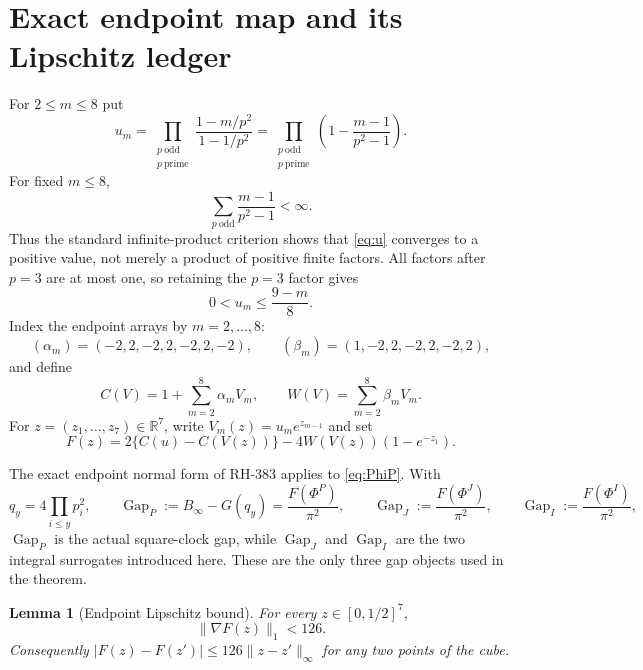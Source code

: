 \documentclass[11pt]{article}
\newtheorem{lemma}[theorem]{Lemma}
\theoremstyle{definition}
\theoremstyle{remark}
\newcommand{\PhiP}{\Phi^{P}}
\newcommand{\PhiJ}{\Phi^{J}}
\newcommand{\PhiI}{\Phi^{I}}
\newcommand{\GapP}{\operatorname{Gap}_{P}}
\newcommand{\GapJ}{\operatorname{Gap}_{J}}
\newcommand{\GapI}{\operatorname{Gap}_{I}}
\newcommand{\Binfty}{B_{\infty}}
\begin{document}
\section{Exact endpoint map and its Lipschitz ledger}
\label{sec:endpoint}

For $2\le m\le8$ put
\begin{equation}
 u_m=\prod_{\substack{p\ \mathrm{odd}\\p\ \mathrm{prime}}}
     \frac{1-m/p^2}{1-1/p^2}
     =\prod_{\substack{p\ \mathrm{odd}\\p\ \mathrm{prime}}}
     \left(1-\frac{m-1}{p^2-1}\right).
 \label{eq:u}
\end{equation}
For fixed $m\le8$,
\[
 \sum_{p\ \mathrm{odd}}\frac{m-1}{p^2-1}<\infty.
\]
Thus the standard infinite-product criterion shows that \eqref{eq:u}
converges to a positive value, not merely a product of positive finite
factors.  All factors after $p=3$ are at most one, so retaining the
$p=3$ factor gives
\begin{equation}
 0<u_m\le \frac{9-m}{8}.
 \label{eq:u-bound}
\end{equation}
Index the endpoint arrays by $m=2,\ldots,8$:
\begin{equation}
 (\alpha_m)=(-2,2,-2,2,-2,2,-2),\qquad
 (\beta_m)=(1,-2,2,-2,2,-2,2),
 \label{eq:arrays}
\end{equation}
and define
\[
 C(V)=1+\sum_{m=2}^8\alpha_mV_m,\qquad
 W(V)=\sum_{m=2}^8\beta_mV_m.
\]
For $z=(z_1,\ldots,z_7)\in\mathbb R^7$, write
$V_m(z)=u_me^{z_{m-1}}$ and set
\begin{equation}
 F(z)=2\{C(u)-C(V(z))\}
      -4W(V(z))(1-e^{-z_1}).
 \label{eq:F}
\end{equation}

The exact endpoint normal form of RH-383 \cite{RH383} applies to
\eqref{eq:PhiP}.  With
\begin{equation}
 q_y=4\prod_{i\le y}p_i^2,\qquad
 \GapP:=\Binfty-G(q_y)=\frac{F(\PhiP)}{\pi^2},\qquad
 \GapJ:=\frac{F(\PhiJ)}{\pi^2},\qquad
 \GapI:=\frac{F(\PhiI)}{\pi^2},
 \label{eq:gaps}
\end{equation}
$\GapP$ is the actual square-clock gap, while $\GapJ$ and $\GapI$ are
the two integral surrogates introduced here.  These are the only three
gap objects used in the theorem.

\begin{lemma}[Endpoint Lipschitz bound]
\label{lem:lipschitz}
For every $z\in[0,1/2]^7$,
\begin{equation}
 \|\nabla F(z)\|_1<126.
 \label{eq:gradient}
\end{equation}
Consequently $|F(z)-F(z')|\le126\|z-z'\|_\infty$ for any two points of
the cube.
\end{lemma}
\end{document}

